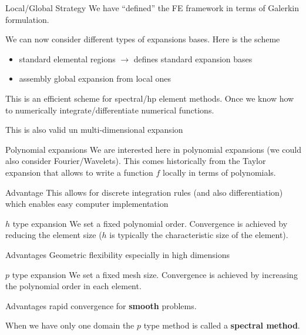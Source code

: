 \begin{frame}{Local/Global Strategy}
  We have ``defined'' the FE framework in terms of Galerkin formulation.

  We can now consider different types of expansions bases. Here is the scheme
  \begin{itemize}
  \item standard elemental regions $\rightarrow$ defines standard expansion bases
  \item assembly global expansion from local ones
  \end{itemize}

  This is an efficient scheme for spectral/hp element methods. Once we
  know how to numerically integrate/differentiate numerical
  functions.

  \begin{alertblock}{}
    This is also valid un multi-dimensional expansion
  \end{alertblock}
\end{frame}

\begin{frame}{Polynomial expansions}
  We are interested here in polynomial expansions (we could also
  consider Fourier/Wavelets).  This comes historically from the Taylor
  expansion that allows to write a function $f$ locally in terms of
  polynomials.

  \begin{block}{Advantage}
    This allows for discrete integration rules (and also
    differentiation) which enables easy computer implementation
  \end{block}
\end{frame}

\begin{frame}{$h$ type expansion}
  We set a fixed polynomial order. Convergence is achieved by
  reducing the element size ($h$ is typically the characteristic size
  of the element).

  \begin{block}{Advantages}
    Geometric flexibility especially in high dimensions
  \end{block}
\end{frame}

\begin{frame}{$p$ type expansion}
  We set a fixed mesh size. Convergence is achieved by
  increasing the polynomial order in each element.

  \begin{block}{Advantages}
    rapid convergence for \textbf{smooth} problems.
  \end{block}
  When we have only one domain the $p$ type method is called a \textbf{spectral method}.
\end{frame}

